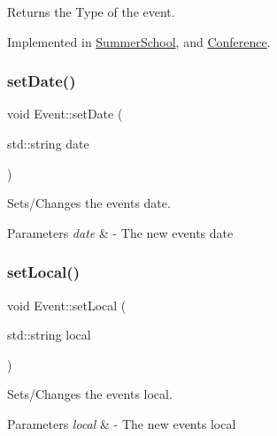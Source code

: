 Returns the Type of the event. 



Implemented in \hyperlink{classSummerSchool_a2ba547411ca8f161c2c579f9f55f913e}{Summer\+School}, and \hyperlink{classConference_ad1cf07b29a4c4cc36483603ef9536186}{Conference}.

\mbox{\label{classEvent_a21f01e4574335753b415d3445f1ebdff}} 
\subsubsection{\texorpdfstring{set\+Date()}{setDate()}}
{\footnotesize\ttfamily void Event\+::set\+Date (\begin{DoxyParamCaption}\item[{std\+::string}]{date }\end{DoxyParamCaption})}



Sets/\+Changes the event\textquotesingle{}s date. 


\begin{DoxyParams}{Parameters}
{\em date} & -\/ The new event\textquotesingle{}s date \\
\hline
\end{DoxyParams}
\mbox{\label{classEvent_ab4e1fd7cd5e56f58d3cd36a69e475054}} 
\subsubsection{\texorpdfstring{set\+Local()}{setLocal()}}
{\footnotesize\ttfamily void Event\+::set\+Local (\begin{DoxyParamCaption}\item[{std\+::string}]{local }\end{DoxyParamCaption})}



Sets/\+Changes the event\textquotesingle{}s local. 


\begin{DoxyParams}{Parameters}
{\em local} & -\/ The new event\textquotesingle{}s local \\
\hline
\end{DoxyParams}
\mbox{\label{classEvent_abdd2c869f0231002c2a16813923586fb}} 
